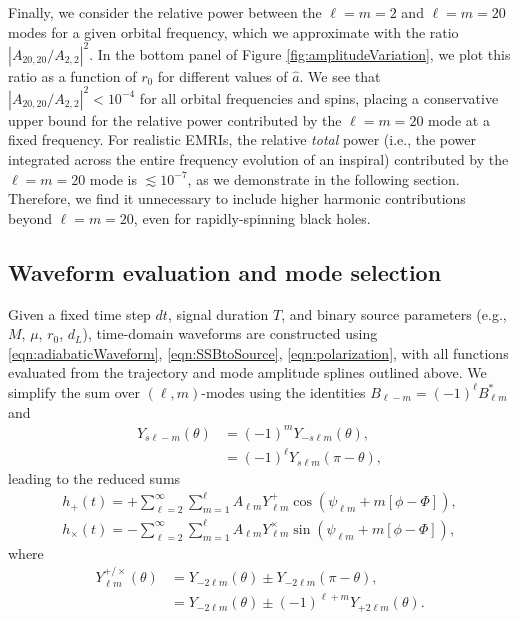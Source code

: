 \documentclass[%
 reprint,
 nofootinbib,
 amsmath,amssymb,
 aps,
 prd,
]{revtex4-2}
\begin{document}
Finally, we consider the relative power between the $\ell = m = 2$ and $\ell = m = 20$ modes for a given orbital frequency, which we approximate with the ratio $|A_{20,20}/A_{2,2}|^2$. In the bottom panel of Figure \ref{fig:amplitudeVariation}, we plot this ratio as a function of $r_0$ for different values of $\hat{a}$. We see that  $|A_{20,20}/A_{2,2}|^2 < 10^{-4}$ for all orbital frequencies and spins, placing a conservative upper bound for the relative power contributed by the $\ell = m = 20$ mode at a fixed frequency. For realistic EMRIs, the relative \emph{total} power (i.e., the power integrated across the entire frequency evolution of an inspiral) contributed by the $\ell = m = 20$ mode is $\lesssim 10^{-7}$, as we demonstrate in the following section. Therefore, we find it unnecessary to include higher harmonic contributions beyond $\ell = m = 20$, even for rapidly-spinning black holes.

\subsection{Waveform evaluation and mode selection}
\label{sec:wave}

Given a fixed time step $dt$, signal duration $T$, and binary source parameters (e.g., $M$, $\mu$, $r_0$, $d_L$), time-domain waveforms are constructed using \eqref{eqn:adiabaticWaveform}, \eqref{eqn:SSBtoSource}, \eqref{eqn:polarization}, with all functions evaluated from the trajectory and mode amplitude splines outlined above. We simplify the sum over $(\ell, m)$-modes using the identities $B_{\ell -m} = (-1)^\ell B^*_{\ell m}$ and
\begin{subequations}
    \begin{align}
    Y_{s\ell -m}(\theta) &= (-1)^{m} Y_{-s \ell m}(\theta),
    \\
    &= (-1)^{\ell} Y_{s \ell m}(\pi-\theta),
    \end{align}
\end{subequations}
leading to the reduced sums
\begin{subequations} \label{eqn:timeDomainReduced}
    \begin{align}
    h_+(t) = +\sum_{\ell=2}^\infty \sum_{ m = 1}^{\ell} A_{\ell m} Y^+_{\ell m} \cos(\psi_{\ell m} + m[\phi - \Phi]),
    \\
    h_\times(t) = -\sum_{\ell=2}^\infty \sum_{ m = 1}^{\ell}  A_{\ell m} Y^\times_{\ell m} \sin(\psi_{\ell m} + m[\phi - \Phi]),
\end{align}
\end{subequations}
where
\begin{subequations}
    \begin{align}
    Y^{+/\times}_{\ell m}(\theta) &= Y_{-2\ell m}(\theta) \pm Y_{-2\ell m}(\pi - \theta),
    \\
    &= Y_{-2\ell m}(\theta) \pm (-1)^{\ell + m} Y_{+2\ell m}(\theta).
    \end{align}
\end{subequations}
\end{document}
